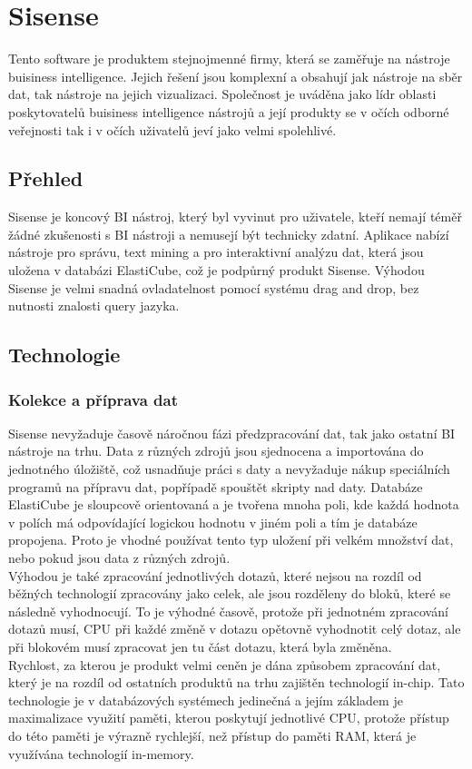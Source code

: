\documentclass[czech,BP]{thesiskiv}
\begin{document}
 
 \section{Sisense}
  Tento software je produktem stejnojmenné firmy, která se zaměřuje na nástroje buisiness intelligence. Jejich řešení jsou komplexní a obsahují jak nástroje na sběr dat, tak nástroje na jejich vizualizaci. Společnost je uváděna jako lídr oblasti poskytovatelů buisiness intelligence nástrojů a její produkty se v očích odborné veřejnosti tak i v očích uživatelů jeví jako velmi spolehlivé.\cite{SisenseStandings}
 
 \subsection{Přehled}

 Sisense je koncový BI nástroj, který byl vyvinut pro uživatele, kteří nemají téměř žádné zkušenosti s BI nástroji a nemusejí být technicky zdatní. Aplikace nabízí nástroje pro správu, text mining a pro interaktivní analýzu dat, která jsou uložena v databázi ElastiCube, což je podpůrný produkt Sisense. Výhodou Sisense je velmi snadná ovladatelnost pomocí systému drag and drop, bez nutnosti znalosti query jazyka.
 \subsection{Technologie}
 \subsubsection{Kolekce a příprava dat}
  Sisense nevyžaduje časově náročnou fázi předzpracování dat, tak jako ostatní BI nástroje na trhu. Data z různých zdrojů jsou sjednocena a importována do jednotného úložiště, což usnadňuje práci s daty a nevyžaduje nákup speciálních programů na přípravu dat, popřípadě spouštět skripty nad daty. Databáze ElastiCube je sloupcově orientovaná a je tvořena mnoha poli, kde každá hodnota v polích má odpovídající logickou hodnotu v jiném poli a tím je databáze propojena. Proto je vhodné používat tento typ uložení při velkém množství dat, nebo pokud jsou data z různých zdrojů.
  \\
  Výhodou je také zpracování jednotlivých dotazů, které nejsou na rozdíl od běžných technologií zpracovány jako celek, ale jsou rozděleny do bloků, které se následně vyhodnocují. To je výhodné časově, protože při jednotném zpracování dotazů musí, CPU při každé změně v dotazu opětovně vyhodnotit celý dotaz, ale při blokovém musí zpracovat jen tu část dotazu, která byla změněna.\cite{ElasticCube}
  \\
  Rychlost, za kterou je produkt velmi ceněn je dána způsobem zpracování dat, který je na rozdíl od ostatních produktů na trhu zajištěn technologií in-chip. Tato technologie je v databázových systémech jedinečná a jejím základem je maximalizace využití paměti, kterou poskytují jednotlivé CPU, protože přístup do této paměti je výrazně rychlejší, než přístup do paměti RAM, která je využívána technologií in-memory.
\end{document}

